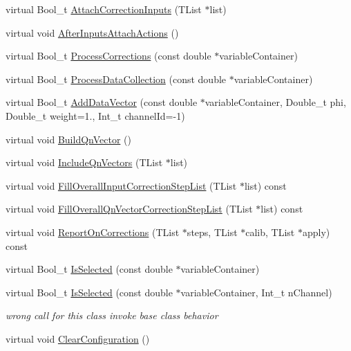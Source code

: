 \begin{DoxyCompactItemize}
\item 
virtual Bool\+\_\+t \mbox{\hyperlink{classQn_1_1DetectorConfigurationTracks_afd9a049e63b16797cd03e6b54d8e209e}{Attach\+Correction\+Inputs}} (T\+List $\ast$list)
\item 
virtual void \mbox{\hyperlink{classQn_1_1DetectorConfigurationTracks_af7f3db92b08c789136fdc0ab97e6576e}{After\+Inputs\+Attach\+Actions}} ()
\item 
virtual Bool\+\_\+t \mbox{\hyperlink{classQn_1_1DetectorConfigurationTracks_a14705aef0b98cfe6d2b20c51676bcc0a}{Process\+Corrections}} (const double $\ast$variable\+Container)
\item 
virtual Bool\+\_\+t \mbox{\hyperlink{classQn_1_1DetectorConfigurationTracks_ab47360b36191cf52c8c9227c3f90fc85}{Process\+Data\+Collection}} (const double $\ast$variable\+Container)
\item 
virtual Bool\+\_\+t \mbox{\hyperlink{classQn_1_1DetectorConfigurationTracks_a0bfa5af566c04893c1c673ddcae7a7c5}{Add\+Data\+Vector}} (const double $\ast$variable\+Container, Double\+\_\+t phi, Double\+\_\+t weight=1., Int\+\_\+t channel\+Id=-\/1)
\item 
virtual void \mbox{\hyperlink{classQn_1_1DetectorConfigurationTracks_a9194c0e1f6e84a8c8fc249b05ee8afb5}{Build\+Qn\+Vector}} ()
\item 
virtual void \mbox{\hyperlink{classQn_1_1DetectorConfigurationTracks_ac1c478bdcd744a466d0665eb6062317f}{Include\+Qn\+Vectors}} (T\+List $\ast$list)
\item 
virtual void \mbox{\hyperlink{classQn_1_1DetectorConfigurationTracks_a3ef9f093c8d272b48f7371b23eb3d498}{Fill\+Overall\+Input\+Correction\+Step\+List}} (T\+List $\ast$list) const
\item 
virtual void \mbox{\hyperlink{classQn_1_1DetectorConfigurationTracks_a4e725e8d949ab829c804b4e5d9323ff6}{Fill\+Overall\+Qn\+Vector\+Correction\+Step\+List}} (T\+List $\ast$list) const
\item 
virtual void \mbox{\hyperlink{classQn_1_1DetectorConfigurationTracks_a7f28703d7e981a3a0c2fe89116194087}{Report\+On\+Corrections}} (T\+List $\ast$steps, T\+List $\ast$calib, T\+List $\ast$apply) const
\item 
virtual Bool\+\_\+t \mbox{\hyperlink{classQn_1_1DetectorConfigurationTracks_a5382a901ca706cab5df207b3c503df65}{Is\+Selected}} (const double $\ast$variable\+Container)
\item 
\mbox{\label{classQn_1_1DetectorConfigurationTracks_a0f65ed87a9163d30aa8897dec30c4b8d}} 
virtual Bool\+\_\+t \mbox{\hyperlink{classQn_1_1DetectorConfigurationTracks_a0f65ed87a9163d30aa8897dec30c4b8d}{Is\+Selected}} (const double $\ast$variable\+Container, Int\+\_\+t n\+Channel)
\begin{DoxyCompactList}\small\item\em wrong call for this class invoke base class behavior \end{DoxyCompactList}\item 
virtual void \mbox{\hyperlink{classQn_1_1DetectorConfigurationTracks_aba7ffa70d60483d7e51460e4309b0fb2}{Clear\+Configuration}} ()
\end{DoxyCompactItemize}
